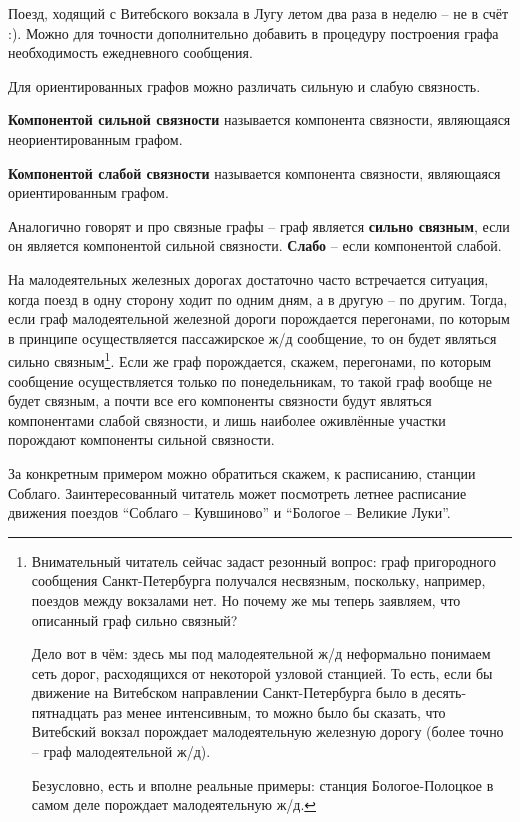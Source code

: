 \begin{remark}
	Поезд, ходящий с Витебского вокзала в Лугу летом два раза в неделю -- не в счёт :). Можно для точности дополнительно добавить в процедуру построения графа необходимость ежедневного сообщения.
\end{remark}

Для ориентированных графов можно различать сильную и слабую связность.
\begin{definition} \label{str_con}
	\textbf{Компонентой сильной связности} называется компонента связности, являющаяся неориентированным графом.
\end{definition}

\begin{definition} \label{weak_con}
	\textbf{Компонентой слабой связности} называется компонента связности, являющаяся ориентированным графом.
\end{definition}

\begin{definition} \label{cw_con_g}
	Аналогично говорят и про связные графы -- граф является \textbf{сильно связным}, если он является компонентой сильной связности. \textbf{Слабо} -- если компонентой слабой.
\end{definition}

\begin{example}
	На малодеятельных железных дорогах достаточно часто встречается ситуация, когда поезд в одну сторону ходит по одним дням, а в другую -- по другим. Тогда, если граф малодеятельной железной дороги порождается перегонами, по которым в принципе осуществляется пассажирское ж/д сообщение, то он будет являться сильно связным\footnote{Внимательный читатель сейчас задаст резонный вопрос: граф пригородного сообщения Санкт-Петербурга получался несвязным, поскольку, например, поездов между вокзалами нет. Но почему же мы теперь заявляем, что описанный граф сильно связный? 
		
	Дело вот в чём: здесь мы под малодеятельной ж/д неформально понимаем сеть дорог, расходящихся от некоторой узловой станцией. То есть, если бы движение на Витебском направлении Санкт-Петербурга было в десять-пятнадцать раз менее интенсивным, то можно было бы сказать, что Витебский вокзал порождает малодеятельную железную дорогу (более точно -- граф малодеятельной ж/д).

	Безусловно, есть и вполне реальные примеры: станция Бологое-Полоцкое в самом деле порождает малодеятельную ж/д.}. Если же граф порождается, скажем, перегонами, по которым сообщение осуществляется только по понедельникам, то такой граф вообще не будет связным, а почти все его компоненты связности будут являться компонентами слабой связности, и лишь наиболее оживлённые участки порождают компоненты сильной связности.
	
	За конкретным примером можно обратиться скажем, к расписанию, станции Соблаго. Заинтересованный читатель может посмотреть летнее расписание движения поездов ``Соблаго -- Кувшиново'' и ``Бологое -- Великие Луки''.
\end{example}

